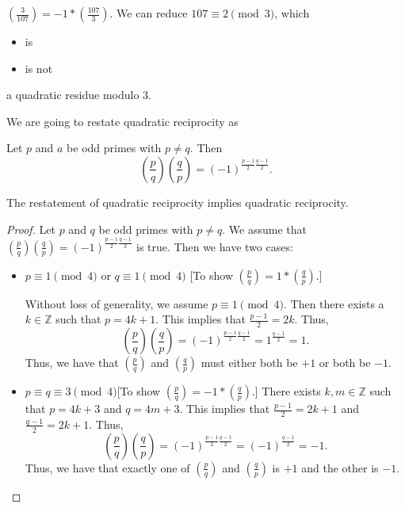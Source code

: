 \documentclass[letterpaper, 11 pt]{article}
\begin{document}
\begin{poll}
 $\left(\frac{3}{107}\right)= {-1}
* \left(\frac{107}{3}\right)$. We can reduce $107\equiv {2}
 \pmod{3}$, which 
\begin{itemize}
 \item{is}
 \item   {is not}
\end{itemize}
a quadratic residue modulo 3. %
\end{poll}

We are going to restate quadratic reciprocity as
\begin{thm}
 Let $p$ and $a$ be odd primes with $p\neq q$. Then \[\left(\frac{p}{q}\right)\left(\frac{q}{p}\right)=(-1)^{\frac{p-1}{2}\frac{q-1}{2}}.\]
\end{thm}

\begin{prop}The restatement of quadratic reciprocity implies quadratic reciprocity.
\end{prop}
\begin{proof}
 Let $p$ and $q$ be odd primes with $p\neq q$. We assume that $\left(\frac{p}{q}\right)\left(\frac{q}{p}\right)=(-1)^{\frac{p-1}{2}\frac{q-1}{2}}$ is true. Then we have two cases:
 
\begin{itemize}
 \item $p\equiv 1 \pmod 4$ or $q\equiv 1 \pmod 4$ [To show $\left(\frac{p}{q}\right)= {1}
* \left(\frac{q}{p}\right)$.]

Without loss of generality, we assume $p\equiv 1 \pmod 4$. Then there exists a $k\in\mathbb{Z}$ such that $p=4k+1$. This implies that $\frac{p-1}{2}=2k$. Thus, \[\left(\frac{p}{q}\right)\left(\frac{q}{p}\right)=(-1)^{\frac{p-1}{2}\frac{q-1}{2}}=1^\frac{q-1}{2}=1.\]
Thus, we have that $\left(\frac{p}{q}\right)$ and $\left(\frac{q}{p}\right)$ must either both be $+1$ or both be $-1$.

\item $p\equiv q\equiv 3 \pmod 4$[To show $\left(\frac{p}{q}\right)= {-1}
* \left(\frac{q}{p}\right)$.]
 There exists $k,m\in\mathbb{Z}$ such that $p=4k+3$ and $q=4m+3$. This implies that $\frac{p-1}{2}=2k+1$ and $\frac{q-1}{2}=2k+1$. Thus, \[\left(\frac{p}{q}\right)\left(\frac{q}{p}\right)=(-1)^{\frac{p-1}{2}\frac{q-1}{2}}=(-1)^\frac{q-1}{2}=-1.\]
Thus, we have that exactly one of $\left(\frac{p}{q}\right)$ and $\left(\frac{q}{p}\right)$ is $+1$ and the other is $-1$. \qedhere
\end{itemize}
\end{proof}
\end{document}

